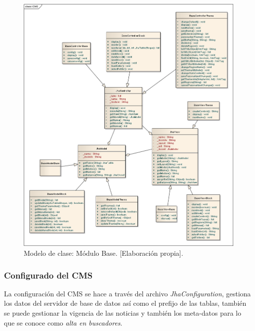 \begin{figure}[h]
\centering
\includegraphics[scale=.35, keepaspectratio=true]{imagenes/13_imagen.png}
\caption{Modelo de clase: M\'odulo Base. [Elaboraci\'on propia].}
\end{figure}

\subsubsection{Configurado del CMS}
La configuraci\'on del CMS se hace a trav\'es del archivo \textit{JhaConfiguration}, gestiona los datos del servidor de base de datos as\'i como el prefijo de las tablas, tambi\'en se puede gestionar la vigencia de las noticias y tambi\'en los meta-datos para lo que se conoce como \textit{alta en buscadores}.

